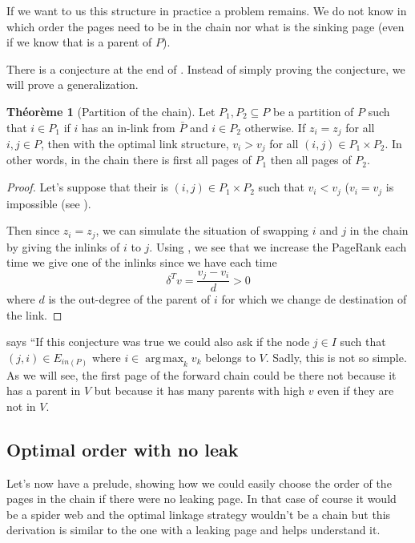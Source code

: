 \documentclass{article}
\DeclareMathOperator*{\argmax}{arg\,max}
\newcommand{\1}{\mathbf{1}}
\theoremstyle{definition}
\newtheorem{mytheo}[mydef]{Théorème}
\begin{document}
If we want to us this structure in practice a problem remains.
We do not know in which order the pages need to be in the chain
nor what is the sinking page (even if we know that is a parent of $P$).

There is a conjecture at the end of \cite{de2008maximizing}.
Instead of simply proving the conjecture, we will prove a generalization.
\begin{mytheo}[Partition of the chain]
  Let $P_1,P_2 \subseteq P$ be a partition of $P$ such that
  $i \in P_1$ if $i$ has an in-link from $\bar{P}$ and $i \in P_2$
  otherwise.
  If $z_i = z_j$ for all $i,j \in P$,
  then with the optimal link structure,
  $v_i > v_j$ for all $(i,j) \in P_1 \times P_2$.
  In other words, in the chain there is first all pages of
  $P_1$ then all pages of $P_2$.
  \begin{proof}
    Let's suppose that their is $(i,j) \in P_1 \times P_2$
    such that $v_i < v_j$ ($v_i = v_j$ is impossible (see \cite[theorem~12]{de2008maximizing}).

    Then since $z_i = z_j$, we can simulate the situation of swapping $i$ and $j$ in the chain
    by giving the inlinks of $i$ to $j$.
    Using \cite[theorem~5]{de2008maximizing}, we see that we increase the PageRank each time we give one of the inlinks since
    we have each time
    \[ \delta^Tv = \frac{v_j - v_i}{d} > 0 \]
    where $d$ is the out-degree of the parent of $i$ for which we change de destination of the link.
  \end{proof}
\end{mytheo}

\cite{de2008maximizing} says
``If this conjecture was true we could also ask if the node $j \in I$ such that
$(j, i) \in E_{in(P)}$ where $i \in \argmax_k v_k$ belongs to $V$.
Sadly, this is not so simple. 
As we will see, the first page of the forward chain could be there not
because it has a parent in $V$ but because it has many parents with high $v$ even if they are not in $V$.

\subsection{Optimal order with no leak}
\label{sec:no_leak}
Let's now have a prelude, showing how we could easily choose the order of the pages in the chain if there were
no leaking page.
In that case of course it would be a spider web and the optimal linkage strategy wouldn't be a chain but this derivation is similar
to the one with a leaking page and helps understand it.
\end{document}
